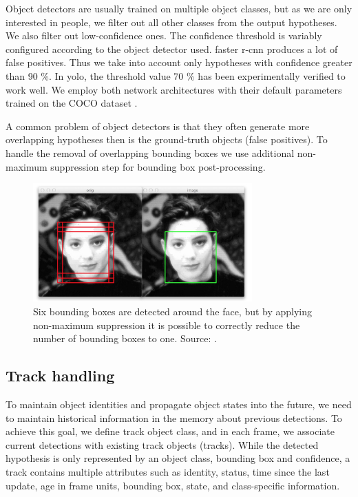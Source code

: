         Object detectors are usually trained on multiple object classes, but as we are only interested in people, we filter out all other classes from the output hypotheses. We also filter out low-confidence ones. The confidence threshold is variably configured according to the object detector used. \Gls{faster r-cnn} produces a lot of false positives. Thus we take into account only hypotheses with confidence greater than 90 \%. In \gls{yolo}, the threshold value 70 \% has been experimentally verified to work well. We employ both network architectures with their default parameters trained on the COCO dataset \cite{lin2014microsoft}. 
        
        A common problem of object detectors is that they often generate more overlapping hypotheses then is the ground-truth objects (false positives). To handle the removal of overlapping bounding boxes we use additional non-maximum suppression step \cite{rosebrocknms} for bounding box post-processing.
        
        \begin{figure}[ht]
            \centering
            \includegraphics[width=0.75\textwidth]{resources/non_maximum_surpression.png}
            \caption{Six bounding boxes are detected around the face, but by applying non-maximum suppression it is possible to correctly reduce the number of bounding boxes to one. Source: \cite{rosebrocknms}.}
            \label{fig:non_maximum_surpression}
        \end{figure}
        
    \subsection{Track handling}
        To maintain object identities and propagate object states into the future, we need to maintain historical information in the memory about previous detections. To achieve this goal, we define track object class, and in each frame, we associate current detections with existing track objects (tracks). While the detected hypothesis is only represented by an object class, bounding box and confidence, a track contains multiple attributes such as identity, status, time since the last update, age in frame units, bounding box, state, and class-specific information.
        
